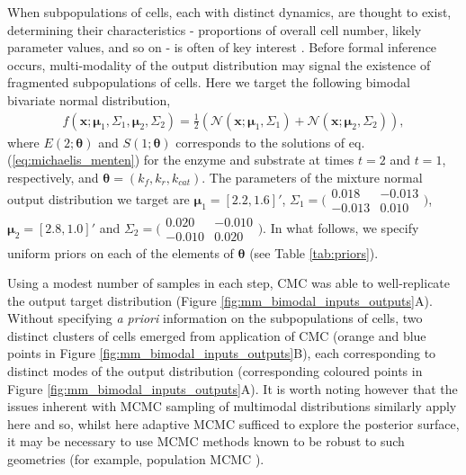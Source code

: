 \documentclass[10pt,letterpaper]{article}
\begin{document}
When subpopulations of cells, each with distinct dynamics, are thought to exist, determining their characteristics - proportions of overall cell number, likely parameter values, and so on - is often of key interest \cite{hasenauer2011identification,loos2018hierarchical}. Before formal inference occurs, multi-modality of the output distribution may signal the existence of fragmented subpopulations of cells. Here we target the following bimodal bivariate normal distribution,
%
\begin{align}
f(\boldsymbol{x}; \boldsymbol{\mu}_1,\Sigma_1, \boldsymbol{\mu}_2, \Sigma_2) = \frac{1}{2}\left(\mathcal{N}(\boldsymbol{x}; \boldsymbol{\mu}_1,\Sigma_1) + \mathcal{N}(\boldsymbol{x}; \boldsymbol{\mu}_2,\Sigma_2)\right),
\end{align}
%
where $E(2; \boldsymbol{\theta})$ and $S(1; \boldsymbol{\theta})$ corresponds to the solutions of eq. (\ref{eq:michaelis_menten}) for the enzyme and substrate at times $t=2$ and $t=1$, respectively, and $\boldsymbol{\theta}=(k_f,k_r,k_{cat})$. The parameters of the mixture normal output distribution we target are $\boldsymbol{\mu}_1=[2.2, 1.6]'$, $\Sigma_1 = \bigl( \begin{smallmatrix}0.018 & -0.013\\ -0.013 & 0.010\end{smallmatrix}\bigr)$, $\boldsymbol{\mu}_2=[2.8, 1.0]'$ and $\Sigma_2=( \begin{smallmatrix}0.020 & -0.010\\ -0.010 & 0.020\end{smallmatrix}\bigr)$. In what follows, we specify uniform priors on each of the elements of $\boldsymbol{\theta}$ (see Table \ref{tab:priors}).


Using a modest number of samples in each step, CMC was able to well-replicate the output target distribution (Figure \ref{fig:mm_bimodal_inputs_outputs}A). Without specifying \textit{a priori} information on the subpopulations of cells, two distinct clusters of cells emerged from application of CMC (orange and blue points in Figure \ref{fig:mm_bimodal_inputs_outputs}B), each corresponding to distinct modes of the output distribution (corresponding coloured points in Figure \ref{fig:mm_bimodal_inputs_outputs}A). It is worth noting however that the issues inherent with MCMC sampling of multimodal distributions similarly apply here and so, whilst here adaptive MCMC \cite{johnstone2016uncertainty} sufficed to explore the posterior surface, it may be necessary to use MCMC methods known to be robust to such geometries (for example, population MCMC \cite{jasra2007population}). 
\end{document}
